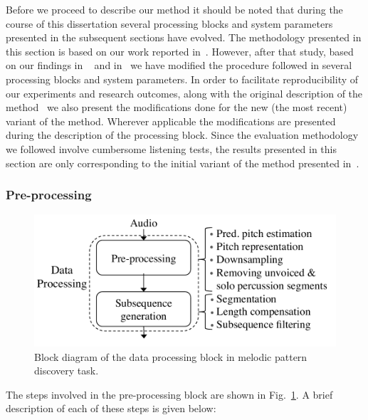 Before we proceed to describe our method it should be noted that during the course of this dissertation several processing blocks and system parameters presented in the subsequent sections have evolved. The methodology presented in this section is based on our work reported in~\cite{gulati_SITIS_2014}. However, after that study, based on our findings in ~\cite{gulati_ICASSP2015} and in~\cite{gulati_ICASSP2015} we have modified the procedure followed in several processing blocks and system parameters. In order to facilitate reproducibility of our experiments and research outcomes, along with the original description of the method~\citep{gulati_SITIS_2014} we also present the modifications done for the new (the most recent) variant of the method. Wherever applicable the modifications are presented during the description of the processing block. Since the evaluation methodology we followed involve cumbersome listening tests, the results presented in this section are only corresponding to the initial variant of the method presented in~\cite{gulati_SITIS_2014}.


\subsubsection{Pre-processing}
\label{sec:pattern_discover_preprocessing}

\begin{figure}
	\begin{center}
		\includegraphics[width=\figSizeEightyFive]{ch06_patterns/figures/discovery/blockDiagram_DataProc.pdf}
	\end{center}
	\caption{Block diagram of the data processing block in melodic pattern discovery task.}
	\label{fig:pattern_discovery_preprocessing_block_diagram}
\end{figure}


The steps involved in the pre-processing block are shown in Fig.~\ref{fig:pattern_discovery_preprocessing_block_diagram}. A brief description of each of these steps is given below:

